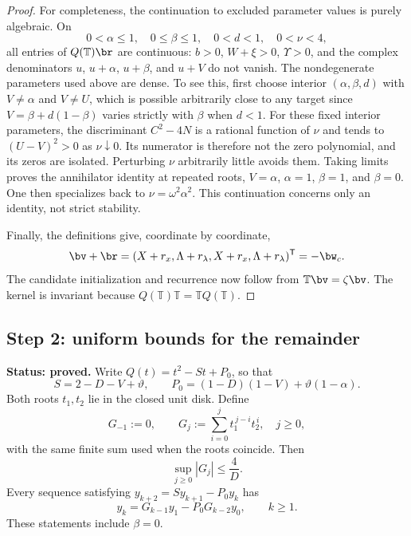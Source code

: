 \begin{proof}
For completeness, the continuation to excluded parameter values is
purely algebraic. On
\[
0<\alpha\le1,\quad 0\le\beta\le1,\quad 0<d<1,
\quad 0<\nu<4,
\]
all entries of \(Q(\mathbb{T})\br\) are continuous: \(b>0\),
\(W+\xi>0\), \(\Upsilon>0\), and the complex denominators
\(u\), \(u+\alpha\), \(u+\beta\), and \(u+V\) do not vanish.
The nondegenerate parameters used above are dense. To see this, first
choose interior \((\alpha,\beta,d)\) with \(V\ne\alpha\) and
\(V\ne U\), which is possible arbitrarily close to any target since
\(V=\beta+d(1-\beta)\) varies strictly with \(\beta\) when \(d<1\).
For these fixed interior parameters, the discriminant
\(C^2-4N\) is a rational function of \(\nu\) and tends to
\((U-V)^2>0\) as \(\nu\downarrow0\). Its numerator is therefore
not the zero polynomial, and its zeros are isolated. Perturbing \(\nu\)
arbitrarily little avoids them. Taking limits proves the annihilator
identity at repeated roots, \(V=\alpha\), \(\alpha=1\),
\(\beta=1\), and \(\beta=0\). One then specializes back to
\(\nu=\omega^2\alpha^2\). This continuation concerns only an
identity, not strict stability.

Finally, the definitions give, coordinate by coordinate,
\[
\bv+\br
=(X+r_x,\Lambda+r_\lambda,X+r_x,\Lambda+r_\lambda)^{\mathsf{T}}
=-\bw_c.
\]
The candidate initialization and recurrence now follow from
\(\mathbb{T}\bv=\zeta\bv\). The kernel is invariant because
\(Q(\mathbb{T})\mathbb{T}=\mathbb{T}Q(\mathbb{T})\).
\end{proof}

\subsection{Step 2: uniform bounds for the remainder}
\label{subsec:q3-large-remainder}

\begin{lemma}
\label{lem:q3-large-kernel}
\textbf{Status: proved.}
Write \(Q(t)=t^2-St+P_0\), so that
\[
S=2-D-V+\vartheta,
\qquad P_0=(1-D)(1-V)+\vartheta(1-\alpha).
\]
Both roots \(t_1,t_2\) lie in the closed unit disk. Define
\[
G_{-1}:=0,
\qquad G_j:=\sum_{i=0}^jt_1^{\,j-i}t_2^{\,i},\quad j\ge0,
\]
with the same finite sum used when the roots coincide. Then
\begin{equation}
\sup_{j\ge0}|G_j|\le\frac4D.
\label{eq:q3-large-kernel-bound}
\end{equation}
Every sequence satisfying \(y_{k+2}=Sy_{k+1}-P_0y_k\) has
\begin{equation}
y_k=G_{k-1}y_1-P_0G_{k-2}y_0,\qquad k\ge1.
\label{eq:q3-large-recurrence-solution}
\end{equation}
These statements include \(\beta=0\).
\end{lemma}

